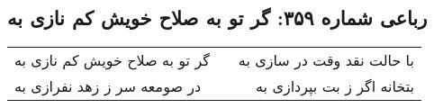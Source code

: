 \begin{center}
\section*{رباعی شماره ۳۵۹: گر تو به صلاح خویش کم نازی به}
\label{sec:sh359}
\begin{longtable}{l p{0.5cm} r}
گر تو به صلاح خویش کم نازی به
&&
با حالت نقد وقت در سازی به
\\
در صومعه سر ز زهد نفرازی به
&&
بتخانه اگر ز بت بپردازی به
\\
\end{longtable}
\end{center}
